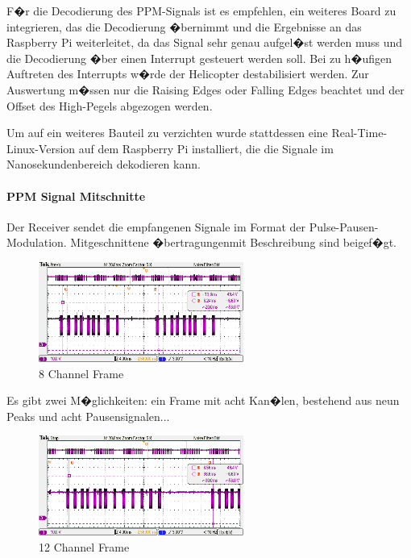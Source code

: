 F�r die Decodierung des PPM-Signals ist es empfehlen, ein weiteres Board zu integrieren, das die Decodierung  �bernimmt und die Ergebnisse an das Raspberry Pi weiterleitet, da das Signal sehr genau aufgel�st werden muss und die Decodierung �ber einen Interrupt gesteuert werden soll. Bei zu h�ufigen Auftreten des Interrupts w�rde der Helicopter destabilisiert werden. Zur Auswertung m�ssen nur die Raising Edges oder Falling Edges beachtet und der Offset des High-Pegels abgezogen werden.

Um auf ein weiteres Bauteil zu verzichten wurde stattdessen eine Real-Time-Linux-Version auf dem Raspberry Pi installiert, die die Signale im Nanosekundenbereich dekodieren kann.

\newpage
\paragraph{PPM Signal Mitschnitte}
Der Receiver sendet die empfangenen Signale im Format der Pulse-Pausen-Modulation. Mitgeschnittene �bertragungen\protect\footnotemark  mit Beschreibung sind beigef�gt.
\begin{figure}[H]
	\centering
	\includegraphics[width=0.6\textwidth]{fig_motor/Controller_Treiber/GraupnerGR16_8_Frame.png}
	\caption[8 Channel Frame]{8 Channel Frame}
\end{figure}

Es gibt zwei M�glichkeiten: ein Frame mit acht Kan�len, bestehend aus neun Peaks und acht Pausensignalen...

\begin{figure}[H]
	\centering
	\includegraphics[width=0.6\textwidth]{fig_motor/Controller_Treiber/GraupnerGR16_12_Frame.png}
	\caption[12 Channel Frame]{12 Channel Frame}
\end{figure}

